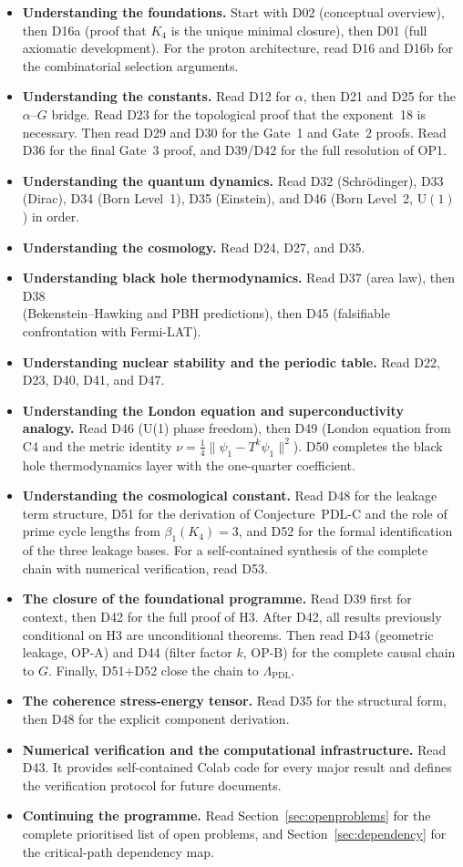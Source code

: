 \documentclass[11pt,a4paper]{article}
\theoremstyle{plain}
\theoremstyle{definition}
\theoremstyle{remark}
\begin{document}
\begin{itemize}
\item \textbf{Understanding the foundations.} Start with D02 (conceptual overview), then D16a (proof that $K_4$ is the unique minimal closure), then D01 (full axiomatic development). For the proton architecture, read D16 and D16b for the combinatorial selection arguments.
\item \textbf{Understanding the constants.} Read D12 for $\alpha$, then D21 and D25 for the $\alpha$--$G$ bridge. Read D23 for the topological proof that the exponent~18 is necessary. Then read D29 and D30 for the Gate~1 and Gate~2 proofs. Read D36 for the final Gate~3 proof, and D39/D42 for the full resolution of OP1.
\item \textbf{Understanding the quantum dynamics.} Read D32 (Schr\"odinger), D33 (Dirac), D34 (Born Level~1), D35 (Einstein), and D46 (Born Level~2, $\mathrm{U}(1)$) in order.
\item \textbf{Understanding the cosmology.} Read D24, D27, and D35.
\item \textbf{Understanding black hole thermodynamics.} Read D37 (area law), then D38 \\ (Bekenstein--Hawking and PBH predictions), then D45 (falsifiable confrontation with Fermi-LAT).
\item \textbf{Understanding nuclear stability and the periodic table.} Read D22, D23, D40, D41, and D47.
\item \textbf{Understanding the London equation and superconductivity analogy.} Read D46 (U(1) phase freedom), then D49 (London equation from C4 and the metric identity $\nu = \tfrac{1}{4}\|\psi_1 - T^k\psi_1\|^2$). D50 completes the black hole thermodynamics layer with the one-quarter coefficient.
\item \textbf{Understanding the cosmological constant.} Read D48 for the leakage term structure, D51 for the derivation of Conjecture~PDL-C and the role of prime cycle lengths from $\beta_1(K_4)=3$, and D52 for the formal identification of the three leakage bases. For a self-contained synthesis of the complete chain with numerical verification, read D53.
\item \textbf{The closure of the foundational programme.} Read D39 first for context, then D42 for the full proof of H3. After D42, all results previously conditional on H3 are unconditional theorems. Then read D43 (geometric leakage, OP-A) and D44 (filter factor $k$, OP-B) for the complete causal chain to $G$. Finally, D51+D52 close the chain to $\Lambda_{\mathrm{PDL}}$.
\item \textbf{The coherence stress-energy tensor.} Read D35 for the structural form, then D48 for the explicit component derivation.
\item \textbf{Numerical verification and the computational infrastructure.} Read D43. It provides self-contained Colab code for every major result and defines the verification protocol for future documents.
\item \textbf{Continuing the programme.} Read Section~\ref{sec:openproblems} for the complete prioritised list of open problems, and Section~\ref{sec:dependency} for the critical-path dependency map.
\end{itemize}
\end{document}
